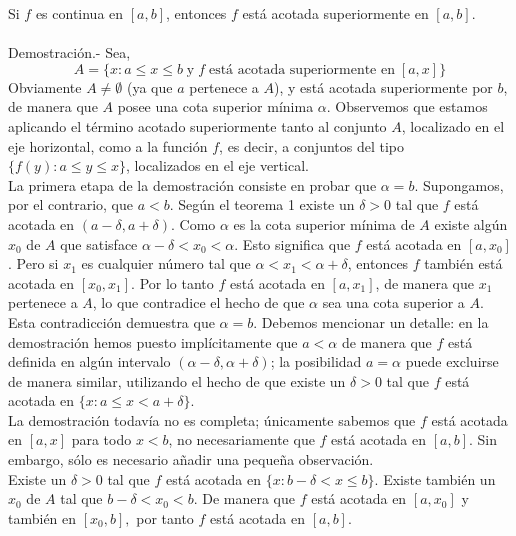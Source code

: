 \setcounter{chapter}{7}
\setcounter{teo}{1}
\begin{teo}
    Si $f$ es continua en $[a,b]$, entonces $f$ está acotada superiormente en $[a,b]$.\\\\
	Demostración.-\; Sea,
	$$A=\lbrace x:a\leq x \leq b \;\mbox{y}\; f \; \mbox{está acotada superiormente en}\; [a,x]\rbrace$$
	Obviamente $A\neq \emptyset$ (ya que $a$ pertenece a $A$), y está acotada superiormente por $b$, de manera que $A$ posee una cota superior mínima $\alpha$. Observemos que estamos aplicando el término acotado superiormente tanto al conjunto $A$, localizado en el eje horizontal, como a la función $f$, es decir, a conjuntos del tipo $\lbrace f(y):a\leq y \leq x\rbrace$, localizados en el eje vertical.\\
	La primera etapa de la demostración consiste en probar que $\alpha=b$. Supongamos, por el contrario, que $a<b$. Según el teorema 1 existe un $\delta >0$ tal que $f$ está acotada en $(a-\delta,a+\delta)$. Como $\alpha$ es la cota superior mínima de $A$ existe algún $x_0$ de $A$ que satisface $\alpha-\delta<x_0<\alpha$. Esto significa que $f$ está acotada en $[a,x_0]$. Pero si $x_1$ es cualquier número tal que $\alpha<x_1<\alpha+\delta$, entonces $f$ también está acotada en $[x_0,x_1]$. Por lo tanto $f$ está acotada en $[a,x_1]$, de manera que $x_1$ pertenece a $A$, lo que contradice el hecho de que $\alpha$ sea una cota superior a $A$. Esta contradicción demuestra que $\alpha=b$. Debemos mencionar un detalle: en la demostración hemos puesto implícitamente que $a<\alpha$ de manera que $f$ está definida en algún intervalo $(\alpha-\delta,\alpha+\delta)$; la posibilidad $a=\alpha$ puede excluirse de manera similar, utilizando el hecho de que existe un $\delta>0$ tal que $f$ está acotada en $\lbrace x:a\leq x < a + \delta\rbrace$.\\
	La demostración todavía no es completa; únicamente sabemos que $f$ está acotada en $[a,x]$ para todo $x<b$, no necesariamente que $f$ está acotada en $[a,b]$. Sin embargo, sólo es necesario añadir una pequeña observación.\\
	Existe un $\delta>0$ tal que $f$ está acotada en $\lbrace x:b-\delta < x \leq b \rbrace$. Existe también un $x_0$ de $A$ tal que $b-\delta<x_0<b$. De manera que $f$ está acotada en $[a,x_0]$ y también en $[x_0,b],$ por tanto $f$ está acotada en $[a,b]$.\\\\
\end{teo}

